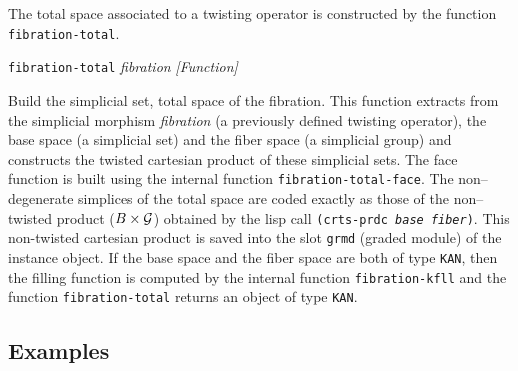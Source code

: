 The total space associated to a twisting operator is constructed 
by the function {\tt fibration-total}.
\vskip 0.30cm
{\parindent=0mm
{\leftskip=5mm
{\tt fibration-total} {\em fibration} \hfill {\em [Function]} \par}
{\leftskip=15mm
Build the simplicial set, total space of the fibration. This function
extracts from the simplicial morphism {\em fibration} (a previously defined twisting operator), 
the base space (a simplicial set) 
and the fiber space (a simplicial group) and constructs
the twisted cartesian product of these simplicial sets. 
The face function is built using the internal function {\tt fibration-total-face}.
The non--degenerate simplices of the total space are coded exactly as those of
the non--twisted product ($ B \times {\cal G}$) obtained by the lisp call
{\tt (crts-prdc {\em base} {\em fiber})}. This non-twisted cartesian product is saved
into the slot {\tt grmd} (graded module) of the instance object.
If the base space  and the fiber space  are both of type {\tt KAN}, then the filling function is computed
by the internal function {\tt fibration-kfll} and  the function {\tt fibration-total}
returns  an object of type {\tt KAN}.  \par}
}

\subsection* {Examples}

